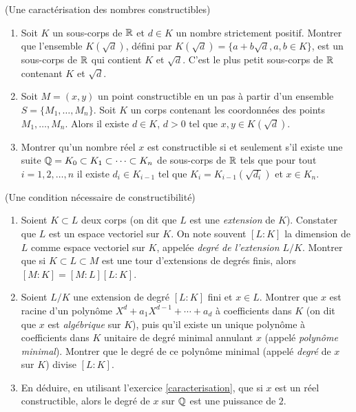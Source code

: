 \documentclass[a4paper,11pt,reqno]{amsart}
\begin{document}
\begin{exo} \label{caracterisation} (Une caractérisation des nombres constructibles)

  \begin{enumerate}
    \item Soit $K$ un sous-corps de $\mathbb{R}$ et $d \in K$ un nombre strictement positif. Montrer que l'ensemble $K(\sqrt{d})$, défini par $K(\sqrt{d})=\{a+b\sqrt{d}, a, b \in K\}$, est un sous-corps de $\mathbb{R}$ qui contient $K$ et $\sqrt{d}$. C'est le plus petit sous-corps de $\mathbb{R}$ contenant $K$ et $\sqrt{d}$.
    \item Soit $M=(x,y)$ un point constructible en un pas à partir d'un ensemble $S=\{M_1,\ldots,M_n\}$. Soit $K$ un corps contenant les coordonnées des points $M_1,\ldots,M_n$. Alors il existe $d \in K$, $d>0$ tel que $x,y \in K(\sqrt{d})$.
    \item Montrer qu'un nombre réel $x$ est constructible si et seulement s'il existe une suite $\mathbb{Q}=K_0 \subset K_1 \subset \cdots \subset K_n$ de sous-corps de $\mathbb{R}$ tels que pour tout $i=1,2,\ldots,n$ il existe $d_i \in K_{i-1}$ tel que $K_i=K_{i-1}(\sqrt{d_i})$ et $x \in K_n$.
  \end{enumerate}
\end{exo}


\begin{exo}  (Une condition nécessaire de constructibilité)
  \begin{enumerate}
    \item Soient $K \subset L$ deux corps (on dit que $L$ est une \emph{extension} de $K$). Constater que $L$ est un espace vectoriel sur $K$. On note souvent $[L:K]$ la dimension de $L$ comme espace vectoriel sur $K$, appelée \emph{degré de l'extension $L/K$}. Montrer que si $K \subset L \subset M$ est une tour d'extensions de degrés finis, alors $[M:K]=[M:L][L:K]$.
    \item Soient $L/K$ une extension de degré $[L:K]$ fini et $x \in L$. Montrer que $x$ est racine d'un polynôme $X^d+a_1 X^{d-1} + \cdots + a_d$ à coefficients dans $K$ (on dit que $x$ est \emph{algébrique} sur $K$), puis qu'il existe un unique polynôme à coefficients dans $K$ unitaire de degré minimal annulant $x$ (appelé \textit{polynôme minimal}). Montrer que le degré de ce polynôme minimal (appelé \emph{degré} de $x$ sur $K$) divise $[L:K]$.
    \item En déduire, en utilisant l'exercice \ref{caracterisation}, que si $x$ est un réel constructible, alors le degré de $x$ sur $\mathbb{Q}$ est une puissance de $2$.
  \end{enumerate}
\end{exo}
\end{document}
